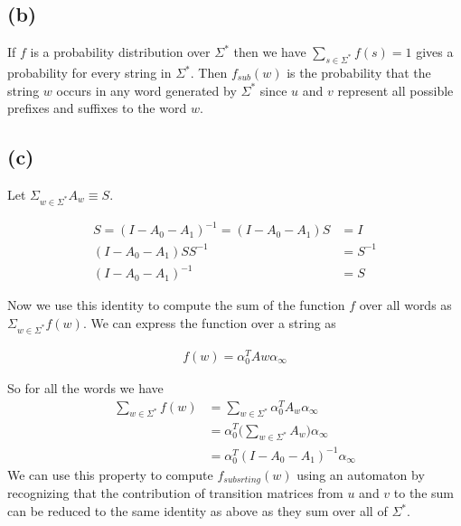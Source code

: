 \documentclass[11pt]{amsart}
\begin{document}
\subsection{(b)}

If $f$ is a probability distribution over $\Sigma^*$ then we have $\sum_{s \in \Sigma^*} f(s) = 1$ gives a probability for every string in $\Sigma^*$. Then $f_{sub}(w)$ is the probability that the string $w$ occurs in any word generated by $\Sigma^*$ since $u$ and $v$ represent all possible prefixes and suffixes to the word $w$.

\subsection{(c)}

Let $ \Sigma_{w \in \Sigma^*} A_w \equiv S$.

\begin{equation}
\begin{aligned}
S = (I - A_0 - A_1)^{-1} = (I - A_0 - A_1) S          &= I \\
				       (I - A_0 - A_1)SS^{-1} &= S^{-1}	\\
				       (I - A_0 - A_1)^{-1} 	&= S
\end{aligned}
\end{equation}

Now we use this identity to compute the sum of the function $f$ over all words as $ \Sigma_{w \in \Sigma^*} f(w)$. We can express the function over a string as

\begin{equation}
\begin{aligned}
f(w) = \alpha_0^T Aw \alpha_{\infty}
\end{aligned}
\end{equation}

So for all the words we have
\begin{equation}
\begin{aligned}
\sum_{w \in \Sigma^*} f(w) &= \sum_{w \in \Sigma^*} \alpha_0^T A_w \alpha_{\infty} \\
					 &= \alpha_0^T \bigg( \sum_{w \in \Sigma^*}  A_w  \bigg) \alpha_{\infty} \\
					 &= \alpha_0^T (I - A_0 - A_1)^{-1} \alpha_{\infty}
\end{aligned}
\end{equation}
We can use this property to compute $f_{subsrting}(w)$ using an automaton by recognizing that the contribution of transition matrices from $u$ and $v$ to the sum can be reduced to the same identity as above as they sum over all of $\Sigma^*$.
\end{document}
